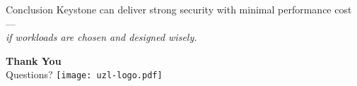 \documentclass[aspectratio=169]{beamer}
\begin{document}

\begin{frame}{Conclusion}
\centering
\Large Keystone can deliver strong security with minimal performance cost — \\
\textit{if workloads are chosen and designed wisely.}
\end{frame}

\begin{frame}
\centering
\Huge\textbf{Thank You}\\
\large Questions? \faQuestionCircle
\vfill
\texttt{[image: uzl-logo.pdf]}
\end{frame}
\end{document}
